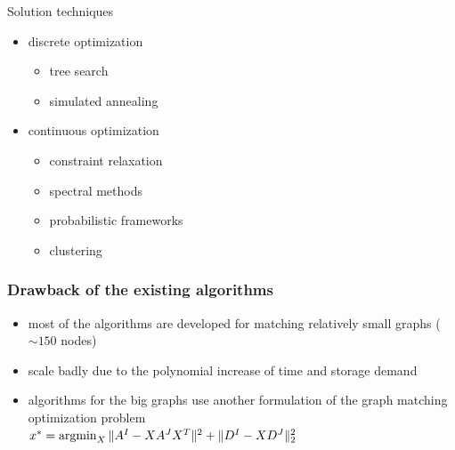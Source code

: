 \documentclass[hyperref={pdfpagelabels=false}]{beamer}
\def\argmin{\mathop{\rm argmin}}						%
\begin{document}
\begin{frame} [allowframebreaks]
Solution techniques~{\tiny\citep{Conte2004}}
\begin{itemize}
\item discrete optimization
	\begin{itemize}
	\item tree search~{\tiny\citep{Bunke1983_inexactGM,Shapiro1981,Fu1979,Wang1995}}
	\item simulated annealing~{\tiny\citep{Herault1990_SimulatedAnnealing}}
	\end{itemize} 
\item continuous optimization
	\begin{itemize}
		\item constraint relaxation~{\tiny\citep{Rangarajan1996_GAGM,Leordeanu2009_IPFP,FastPFP,Vogelstein_BrainGraphs,Zazlavskiy2008_PATH}}
		\item spectral methods~{\tiny\citep{Leordeanu2005_SM,Umeyam1988}}
		\item probabilistic frameworks~{\tiny\citep{Armiti2014,Hancock_Kittler,Hancock_EM_SVD,Sanrom2012}}
		\item clustering~{\tiny\citep{Hancock_ModalClusters,Cho2009_AgglClustering,Hancock_GM_SpectralPart,Lyzinski2015}}
	\end{itemize} 
\end{itemize}
\end{frame}
\begin{frame}
\frametitle{Drawback of the existing algorithms}

\begin{itemize}
\item most of the algorithms are developed for matching relatively small graphs ($\sim 150$ nodes)
\item scale badly due to the polynomial increase of time and storage demand
\item algorithms for the big graphs use another formulation of the graph matching optimization problem\\
\vspace{5pt}
{\centering
$x^* = \argmin_{X}\|A^I-XA^JX^T\|^2+\|D^I-XD^J\|^2_2$}
\end{itemize}

\end{frame}
\end{document}
